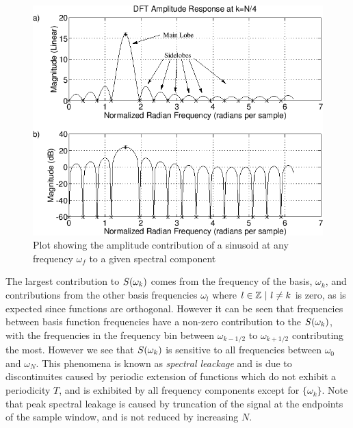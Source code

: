 \begin{figure}[h] \centering
  \includegraphics[width=\textwidth]{Figures/Chapters/SignalAnalysis/img1065}
  \caption{Plot showing the amplitude contribution of a sinusoid at any frequency $\omega_f$ to a given spectral component}
  \label{fig:amplitude-contribution-to-component-by-freq}
\end{figure} The largest contribution to $S(\omega_k)$ comes from the
frequency of the basis, $\omega_k$, and contributions from the other basis
frequencies $\omega_l$ where $l \in { \mathbb{Z}\ |\ l \ne k}$ is zero, as is
expected since functions are orthogonal. However it can be seen that frequencies
between basis function frequencies have a non-zero contribution to the
$S(\omega_k)$, with the frequencies in the frequency bin between
$\omega_{k-1/2}$ to $\omega_{k+1/2}$ contributing the most. However we see that
$S(\omega_k)$ is sensitive to all frequencies between $\omega_0$ and
$\omega_N$. This phenomena is known as \textit{spectral leackage} and is due to
discontinuites caused by periodic extension of functions which do not exhibit a
periodicity $T$, and is exhibited by all frequency components except for $\{
\omega_k \}$. Note that peak spectral leakage is caused by truncation of the
signal at the endpoints of the sample window, and is not reduced by increasing
$N$\cite{}.

